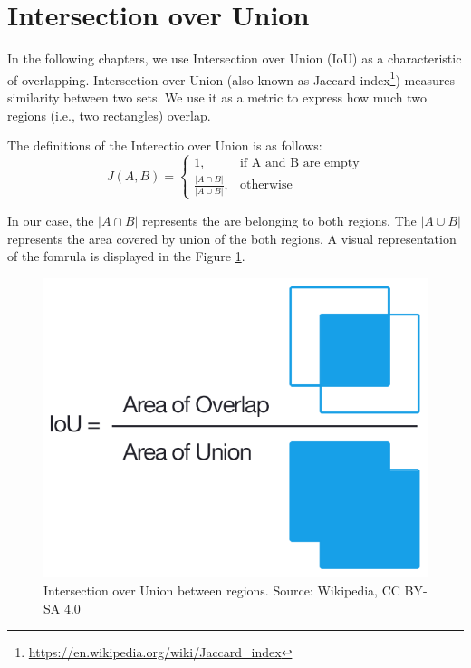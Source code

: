 \section{Intersection over Union}

In the following chapters, we use Intersection over Union (IoU) as a characteristic of overlapping. Intersection over Union (also known as Jaccard index\footnote{\href{https://en.wikipedia.org/wiki/Jaccard_index}{https://en.wikipedia.org/wiki/Jaccard\_index}}) measures similarity between two sets. We use it as a metric to express how much two regions (i.e., two rectangles) overlap. 

The definitions of the Interectio over Union is as follows:
$$
    J(A, B) = 
    \begin{cases}
      1, & \text{if\ A and B are empty} \\
      \frac{|A \cap B|}{|A \cup B|}, & \text{otherwise}
    \end{cases}
$$

In our case, the $|A \cap B|$ represents the are belonging to both regions. The  $|A \cup B|$ represents the area covered by union of the both regions. A visual representation of the fomrula is displayed in the Figure \ref{fig:intersection_over_union}.

\begin{figure}
    \centering
	\includegraphics[width=0.3\linewidth]{img/Intersection_over_Union_-_visual_equation.png}
	\caption{Intersection over Union between regions. Source: Wikipedia, CC BY-SA 4.0}
	\label{fig:intersection_over_union}
\end{figure}








